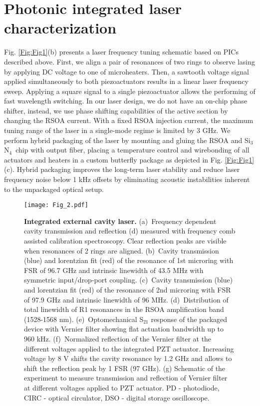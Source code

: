 \documentclass[9pt,twocolumn,twoside, superscriptaddress]{revtex4-2}
\newcommand{\SiN}[0]{Si$_3$N$_4$~}
\begin{document}
\section{Photonic integrated laser characterization}

Fig. \ref{Fig:Fig1}(b) presents a laser frequency tuning schematic based on PICs described above.
First, we align a pair of resonances of two rings to observe lasing by applying DC voltage to one of microheaters.
Then, a sawtooth voltage signal applied simultaneously to both piezoactuators results in a linear laser frequency sweep.
Applying a square signal to a single piezoactuator allows the performing of fast wavelength switching. In our laser design, we do not have an on-chip phase shifter, instead, we use phase shifting capabilities of the active section by changing the RSOA current.
With a fixed RSOA injection current, the maximum tuning range of the laser in a single-mode regime is limited by 3 GHz.%
We perform hybrid packaging of the laser by mounting and gluing the RSOA and \SiN chip with output fiber, placing a temperature control and wirebonding of all actuators and heaters in a custom butterfly package as depicted in Fig. \ref{Fig:Fig1}(c). Hybrid packaging improves the long-term laser stability and reduce laser frequency noise below 1 kHz offsets by eliminating acoustic instabilities inherent to the unpackaged optical setup.

\begin{figure*}[t]
	\centering
	\texttt{[image: Fig\_2.pdf]}
	\caption{
		\footnotesize \linespread{1}
		\textbf{Integrated external cavity laser.}
		(a)~Frequency dependent cavity transmission and reflection (d) measured with frequency comb assisted calibration spectroscopy. Clear reflection peaks are visible when resonances of 2 rings are aligned.
		(b)~Cavity transmission (blue) and lorentzian fit (red) of the resonance of 1st microring with FSR of 96.7 GHz and intrinsic linewidth of 43.5 MHz with symmetric input/drop-port coupling. 
		(c)~Cavity transmission (blue) and lorentzian fit (red) of the resonance of 2nd microring with FSR of 97.9 GHz and intrinsic linewidth of 96 MHz.  
		(d)~Distribution of total linewidth of R1 resonances in the RSOA amplification band (1528-1568 nm).
		(e)~Optomechanical S$_{21}$ response of the packaged device with Vernier filter showing flat actuation bandwidth up to 960 kHz.
		(f)~Normalized reflection of the Vernier filter at the different voltages applied to the integrated PZT actuator. Increasing voltage by 8 V shifts the cavity resonance by 1.2 GHz and allows to shift the reflection peak by 1 FSR (97 GHz).
		(g) Schematic of the experiment to measure transmission and reflection of Vernier filter at different voltages applied to PZT actuator. PD - photodiode, CIRC - optical circulator, DSO - digital storage oscilloscope.
	}
	\label{Fig:Fig2}
\end{figure*}
\end{document}
